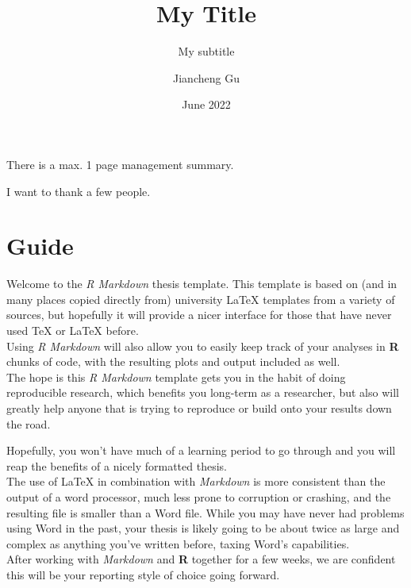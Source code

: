 \documentclass[12pt,oneside]{tisemthesis}
\title{My Title}
\subtitle{My subtitle}
\author{Jiancheng Gu}
\date{June 2022}
\institute{Department of Marketing}
\institute{Department of Marketing}
\begin{document}
  \maketitle

\frontmatter %
\pagestyle{empty} %
  \begin{managementsummary}
    There is a max. 1 page management summary.
  \end{managementsummary}
  \begin{acknowledgements}
    I want to thank a few people.
  \end{acknowledgements}

  \hypersetup{linkcolor=black}
  \setcounter{secnumdepth}{2}
  \setcounter{tocdepth}{2}
  \tableofcontents





\mainmatter %
\pagestyle{fancyplain} %

\hypertarget{guide}{%
\chapter*{Guide}\label{guide}}

Welcome to the \emph{R Markdown} thesis template. This template is based on (and in many places copied directly from) university LaTeX templates from a variety of sources, but hopefully it will provide a nicer interface for those that have never used TeX or LaTeX before.\\
Using \emph{R Markdown} will also allow you to easily keep track of your analyses in \textbf{R} chunks of code, with the resulting plots and output included as well.\\
The hope is this \emph{R Markdown} template gets you in the habit of doing reproducible research, which benefits you long-term as a researcher, but also will greatly help anyone that is trying to reproduce or build onto your results down the road.

Hopefully, you won't have much of a learning period to go through and you will reap the benefits of a nicely formatted thesis.\\
The use of LaTeX in combination with \emph{Markdown} is more consistent than the output of a word processor, much less prone to corruption or crashing, and the resulting file is smaller than a Word file. While you may have never had problems using Word in the past, your thesis is likely going to be about twice as large and complex as anything you've written before, taxing Word's capabilities.\\
After working with \emph{Markdown} and \textbf{R} together for a few weeks, we are confident this will be your reporting style of choice going forward.
\end{document}
